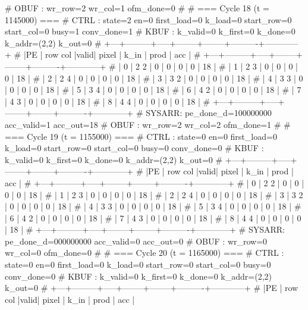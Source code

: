 # OBUF : wr_row=2 wr_col=1 ofm_done=0
# 
# === Cycle 18  (t = 1145000) ===
# CTRL : state=2 en=0 first_load=0 k_load=0 start_row=0 start_col=0 busy=1 conv_done=1
# KBUF : k_valid=0 k_first=0 k_done=0 k_addr=(2,2) k_out=0
# +---+---------+-----+--------+--------+----------+------------+
# |PE | row col |valid| pixel  |  k_in  |   prod   |    acc     |
# +---+---------+-----+--------+--------+----------+------------+
# | 0 |   2   2 |  0  |      0 |      0 |        0 |         18 |
# | 1 |   2   3 |  0  |      0 |      0 |        0 |         18 |
# | 2 |   2   4 |  0  |      0 |      0 |        0 |         18 |
# | 3 |   3   2 |  0  |      0 |      0 |        0 |         18 |
# | 4 |   3   3 |  0  |      0 |      0 |        0 |         18 |
# | 5 |   3   4 |  0  |      0 |      0 |        0 |         18 |
# | 6 |   4   2 |  0  |      0 |      0 |        0 |         18 |
# | 7 |   4   3 |  0  |      0 |      0 |        0 |         18 |
# | 8 |   4   4 |  0  |      0 |      0 |        0 |         18 |
# +---+---------+-----+--------+--------+----------+------------+
# SYSARR: pe_done_d=100000000 acc_valid=1 acc_out=18
# OBUF : wr_row=2 wr_col=2 ofm_done=1
# 
# === Cycle 19  (t = 1155000) ===
# CTRL : state=0 en=0 first_load=0 k_load=0 start_row=0 start_col=0 busy=0 conv_done=0
# KBUF : k_valid=0 k_first=0 k_done=0 k_addr=(2,2) k_out=0
# +---+---------+-----+--------+--------+----------+------------+
# |PE | row col |valid| pixel  |  k_in  |   prod   |    acc     |
# +---+---------+-----+--------+--------+----------+------------+
# | 0 |   2   2 |  0  |      0 |      0 |        0 |         18 |
# | 1 |   2   3 |  0  |      0 |      0 |        0 |         18 |
# | 2 |   2   4 |  0  |      0 |      0 |        0 |         18 |
# | 3 |   3   2 |  0  |      0 |      0 |        0 |         18 |
# | 4 |   3   3 |  0  |      0 |      0 |        0 |         18 |
# | 5 |   3   4 |  0  |      0 |      0 |        0 |         18 |
# | 6 |   4   2 |  0  |      0 |      0 |        0 |         18 |
# | 7 |   4   3 |  0  |      0 |      0 |        0 |         18 |
# | 8 |   4   4 |  0  |      0 |      0 |        0 |         18 |
# +---+---------+-----+--------+--------+----------+------------+
# SYSARR: pe_done_d=000000000 acc_valid=0 acc_out=0
# OBUF : wr_row=0 wr_col=0 ofm_done=0
# 
# === Cycle 20  (t = 1165000) ===
# CTRL : state=0 en=0 first_load=0 k_load=0 start_row=0 start_col=0 busy=0 conv_done=0
# KBUF : k_valid=0 k_first=0 k_done=0 k_addr=(2,2) k_out=0
# +---+---------+-----+--------+--------+----------+------------+
# |PE | row col |valid| pixel  |  k_in  |   prod   |    acc     |
